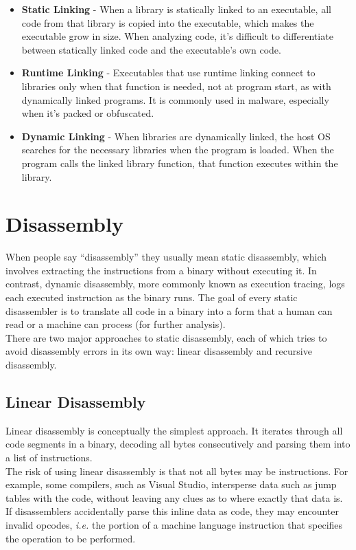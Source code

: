 \begin{itemize}
    \item \textbf{Static Linking} - When a library is statically linked to an executable, all code from that library is copied into the executable, which makes the executable grow in size. When analyzing code, it’s difficult to differentiate between statically linked code and the executable’s own code.
    \item \textbf{Runtime Linking} - Executables that use runtime linking connect to libraries only when that function is needed, not at program start, as with dynamically linked programs. It is commonly used in malware, especially when it’s packed or obfuscated. 
    \item \textbf{Dynamic Linking} - When libraries are dynamically linked, the host OS searches for the necessary libraries when the program is loaded. When the program calls the linked library function, that function executes within the library.
\end{itemize}

\section{Disassembly}
When people say “disassembly” they usually mean static disassembly, which involves extracting the instructions from a binary without executing it. In contrast, dynamic disassembly, more commonly known as execution tracing, logs each executed instruction as the binary runs. The goal of every static disassembler is to translate all code in a binary into a form that a human can read or a machine can process (for further analysis). \\
There are two major approaches to static disassembly, each of which tries to avoid disassembly errors in its own way: linear disassembly and recursive disassembly. 

\subsection{Linear Disassembly}
Linear disassembly is conceptually the simplest approach. It iterates through all code segments in a binary, decoding all bytes consecutively and parsing them into a list of instructions. \\
The risk of using linear disassembly is that not all bytes may be instructions. For example, some compilers, such as Visual Studio, intersperse data such as jump tables with the code, without leaving any clues as to where exactly that data is. If disassemblers accidentally parse this inline data as code, they may encounter invalid opcodes, \textit{i.e.} the portion of a machine language instruction that specifies the operation to be performed.

